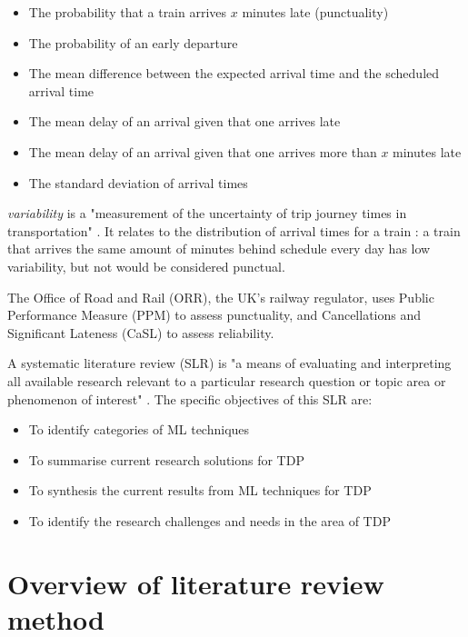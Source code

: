 \documentclass{article}
\begin{document}
\begin{itemize}
	\item The probability that a train arrives $x$ minutes late (punctuality)
	\item The probability of an early departure
	\item The mean difference between the expected arrival time and the scheduled arrival time
	\item The mean delay of an arrival given that one arrives late
	\item The mean delay of an arrival given that one arrives more than $x$ minutes late
	\item The standard deviation of arrival times
\end{itemize}

\textit{variability} is a "measurement of the uncertainty of trip journey times in transportation" \cite{olsson_haugland_2004}. It relates to the distribution of arrival times for a train \cite{noland_polak_2002}:
a train that arrives the same amount of minutes behind schedule every day has low variability, but not would be considered punctual.

The Office of Road and Rail (ORR), the UK's railway regulator, uses Public Performance Measure (PPM) to assess punctuality, and Cancellations and Significant Lateness (CaSL) to assess reliability.

A systematic literature review (SLR) is "a means of evaluating and interpreting all available research relevant to a particular research question or topic area or phenomenon of interest" \cite{williams_hollingsworth_2005}. The specific objectives of this SLR are:

\begin{itemize}
	\item To identify categories of ML techniques
	\item To summarise current research solutions for TDP
	\item To synthesis the current results from ML techniques for TDP
	\item To identify the research challenges and needs in the area of TDP
\end{itemize}

\clearpage
\section{Overview of literature review\\method}
\end{document}
